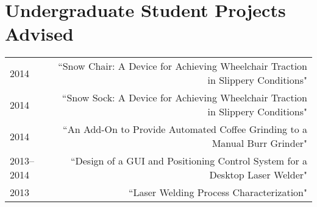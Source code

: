 
\section*{Undergraduate Student Projects Advised}
\begin{tabular}{L!{\VRule}R}
2014&``Snow Chair: A Device for Achieving Wheelchair Traction in Slippery Conditions"\\
2014&``Snow Sock: A Device for Achieving Wheelchair Traction in Slippery Conditions"\\
2014&``An Add-On to Provide Automated Coffee Grinding to a Manual Burr Grinder"\\
2013--2014&``Design of a GUI and Positioning Control System for a Desktop Laser Welder"\\
2013&``Laser Welding Process Characterization"\\
\end{tabular}